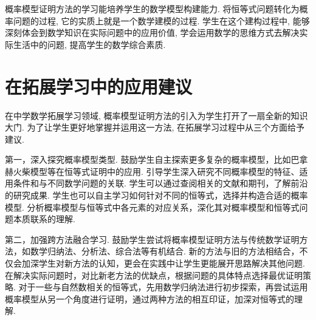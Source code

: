 
概率模型证明方法的学习能培养学生的数学模型构建能力. 将恒等式问题转化为概率问题的过程, 它的实质上就是一个数学建模的过程. 学生在这个建构过程中, 能够深刻体会到数学知识在实际问题中的应用价值, 学会运用数学的思维方式去解决实际生活中的问题, 提高学生的数学综合素质. 


\section{在拓展学习中的应用建议}
在中学数学拓展学习领域, 概率模型证明方法的引入为学生打开了一扇全新的知识大门. 为了让学生更好地掌握并运用这一方法, 在拓展学习过程中从三个方面给予建议. 

第一，深入探究概率模型类型. 鼓励学生自主探索更多复杂的概率模型，比如巴拿赫火柴模型等在恒等式证明中的应用. 引导学生深入研究不同概率模型的特征、适用条件和与不同数学问题的关联. 学生可以通过查阅相关的文献和期刊，了解前沿的研究成果. 学生也可以自主学习如何针对不同的恒等式，选择并构造合适的概率模型. 分析概率模型与恒等式中各元素的对应关系，深化其对概率模型和恒等式问题本质联系的理解. 


第二，加强跨方法融合学习. 鼓励学生尝试将概率模型证明方法与传统数学证明方法，如数学归纳法、分析法、综合法等有机结合. 新的方法与旧的方法相结合，不仅会加深学生对新方法的认知，更会在实践中让学生更能展开思路解决其他问题. 在解决实际问题时，对比新老方法的优缺点，根据问题的具体特点选择最优证明策略. 对于一些与自然数相关的恒等式，先用数学归纳法进行初步探索，再尝试运用概率模型从另一个角度进行证明，通过两种方法的相互印证，加深对恒等式的理解. 



